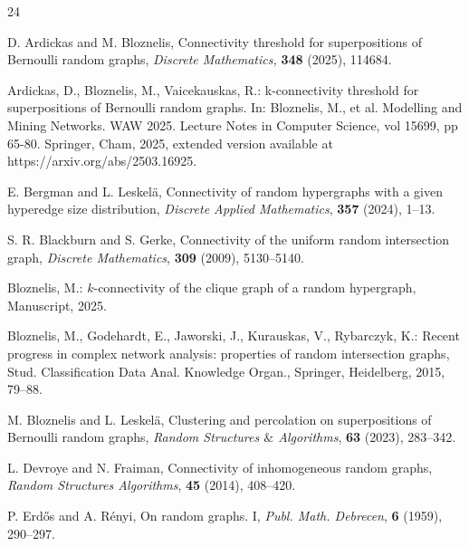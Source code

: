 \documentclass[11pt, a4paper]{article}
\begin{document}
\begin{thebibliography}{24}



D. Ardickas and M. Bloznelis,  
Connectivity threshold for superpositions of Bernoulli random graphs,
{\it Discrete Mathematics,} {\bf 348} (2025), 114684.



Ardickas, D., Bloznelis, M., Vaicekauskas, R.:  
 k-connectivity threshold  for superpositions
 of Bernoulli random graphs.
 In: Bloznelis, M., et al. Modelling and Mining Networks. WAW 2025. Lecture Notes in Computer Science, vol 15699, pp 65-80. Springer, Cham, 2025, extended version available at https://arxiv.org/abs/2503.16925.


 E. Bergman and L.  Leskelä,   
Connectivity of random hypergraphs with a given hyperedge size
distribution, {\it Discrete Applied Mathematics}, {\bf 357} (2024), 1--13.

 
S. R. Blackburn and  S.  Gerke,
Connectivity of the uniform random intersection graph,
{\it Discrete Mathematics}, {\bf 309}  (2009), 5130--5140.

Bloznelis, M.: $k$-connectivity of the clique graph of a random hypergraph, Manuscript, 2025.

Bloznelis, M., Godehardt, E., Jaworski, J., Kurauskas, V., Rybarczyk, K.:
Recent progress in complex network analysis: properties of random intersection graphs,
Stud. Classification Data Anal. Knowledge Organ.,
Springer, Heidelberg, 2015, 79--88.

M. Bloznelis and  L. Leskel\"a,  
Clustering and percolation on superpositions of Bernoulli random graphs,
{\it Random Structures $\&$ Algorithms}, {\bf 63} (2023), 283--342.


L. Devroye and N. Fraiman, 
Connectivity of inhomogeneous random graphs,
{\it Random Structures Algorithms}, {\bf 45} (2014),  408--420.



P. Erd\H os and A. R\'enyi, 
On random graphs. I,
{\it Publ. Math. Debrecen}, {\bf 6} (1959), 290--297.



\end{thebibliography}
\end{document}
